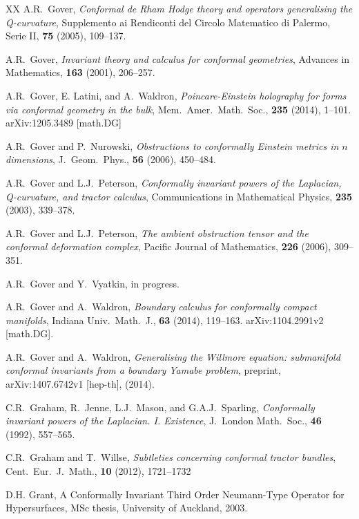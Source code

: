 \documentclass[a4paper,12pt]{amsart}
\theoremstyle{remark}
\begin{document}
\begin{thebibliography}{XX}
 A.R.\ Gover, {\em Conformal de Rham Hodge theory
  and operators generalising the Q-curvature}, Supplemento ai
  Rendiconti del Circolo Matematico di Palermo, Serie II, {\bf 75}
  (2005), 109--137.

 A.R.\ Gover, {\em Invariant theory and calculus for
  conformal geometries}, Advances in Mathematics, {\bf 163} (2001),
  206--257.

 A.R.\ Gover, E. Latini, and A.\ Waldron, {\em
  Poincare-Einstein holography for forms via conformal geometry in the
  bulk}, Mem.\ Amer.\ Math.\ Soc., {\bf 235} (2014), 1--101.  \quad
  arXiv:1205.3489 [math.DG]


 A.R.\ Gover and P.\ Nurowski, {\em Obstructions to
  conformally Einstein metrics in $n$ dimensions}, J.\ Geom.\ Phys.,
  {\bf 56} (2006), 450--484.

 A.R.\ Gover and L.J.\ Peterson, {\em Conformally
  invariant powers of the Laplacian, Q-curvature, and tractor
  calculus}, Communications in Mathematical Physics, {\bf 235} (2003),
  339--378.

 A.R.\ Gover and L.J.\ Peterson, {\em The ambient
  obstruction tensor and the conformal deformation complex}, Pacific
  Journal of Mathematics, {\bf 226} (2006), 309--351.



 A.R.\ Gover and Y.\ Vyatkin, in progress.


 A.R.\ Gover and A.\ Waldron, {\em Boundary
  calculus for conformally compact manifolds}, Indiana
  Univ.\ Math.\ J., {\bf 63} (2014), 119--163. \quad arXiv:1104.2991v2
  [math.DG].



 A.R.\ Gover and A.\ Waldron, {\em Generalising
  the Willmore equation: submanifold conformal invariants from a
  boundary Yamabe problem}, preprint, arXiv:1407.6742v1 [hep-th],
  (2014).



 C.R.\ Graham, R.\ Jenne, L.J.\ Mason, and
  G.A.J.\ Sparling, {\em Conformally invariant powers of the
    Laplacian. I. Existence}, J.\  London Math.\ Soc., {\bf 46} (1992),
  557--565.
		
 C.R.\ Graham and T.\ Willse, {\em Subtleties
  concerning conformal tractor bundles}, Cent.\ Eur.\ J.\ Math., {\bf
  10} (2012), 1721--1732

 D.H. Grant, A Conformally Invariant Third Order Neumann-Type 
		Operator for Hypersurfaces, MSc thesis, University of Auckland, 
		2003.


\end{thebibliography}
\end{document}
